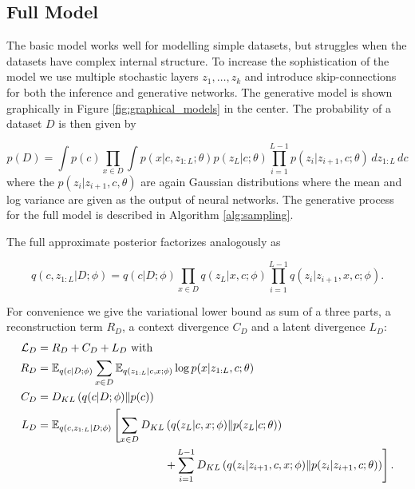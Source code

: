 \documentclass{article} %
\newcommand{\KL}[2]{D_{KL} \left (#1 \| #2 \right )}
\begin{document}
\subsection{Full Model}

The basic model works well for modelling simple datasets, but struggles when the datasets have complex internal structure. To increase the sophistication of the model we use multiple stochastic layers $z_1, \dots, z_k$ and introduce skip-connections for both the inference and generative networks. The generative model is shown graphically in Figure \ref{fig:graphical_models} in the center. The probability of a dataset $D$ is then given by

\begin{equation}
    p(D) = \int p(c) \prod_{x \in D} \int p(x|c,z_{1:L}; \theta) p(z_L | c ; \theta) \prod_{i=1}^{L-1}p(z_{i} | z_{i+1},c ; \theta)\, dz_{1:L} \, dc
\end{equation}
where the $p(z_i | z_{i+1}, c, \theta)$ are again Gaussian distributions where the mean and log variance are given as the output of neural networks. The generative process for the full model is described in Algorithm \ref{alg:sampling}.

The full approximate posterior factorizes analogously as 

\begin{equation}
    q(c,z_{1:L} | D; \phi) = q(c | D; \phi) \prod_{x \in D} q(z_L | x,c; \phi) \prod_{i=1}^{L-1} q(z_{i} | z_{i+1},x,c;\phi).
\end{equation}

For convenience we give the variational lower bound as sum of a three parts, a reconstruction term $R_D$, a context divergence $C_D$ and a latent divergence $L_D$:
\begin{align}
\label{var_lower_bound}
    \mathcal{L}_D &= R_D + C_D + L_D \mbox{ with }\\
    R_D & = \mathbb{E}_{q(c | D;\phi)} 
    \sum_{x \in D} 
    \mathbb{E}_{q(z_{1:L}|c,x ;\phi)} 
    \log p(x|z_{1:L},c ;\theta) \\
    C_D &= \KL{q(c | D ; \phi)}{p(c)}\\
    L_D &= \mathbb{E}_{q(c, z_{1:L} | D ;\phi)} \left [ \sum_{x \in D} \KL{q(z_L | c,x ; \phi)}{p(z_L | c ; \theta)} \right. \nonumber \\ 
    & 
    \mbox{\hspace{4cm}}\left. +\sum_{i=1}^{L-1}
    \KL{q(z_i | z_{i+1},c,x ; \phi)}{p(z_i | z_{i+1},c ; \theta)}
    \right ].
\end{align}
\end{document}

